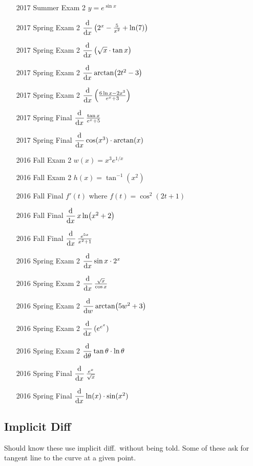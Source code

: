 \documentclass[10pt]{scrartcl}
\theoremstyle{definition}
\newcommand{\inv}{^{-1}}
\begin{document}
\begin{enumerate}
\item [2017 Summer Exam 2] $y = e^{\sin x}$
\item [2017 Spring Exam 2] $\dod{}{x}\left( 2^x - \frac{5}{x^2} + \ln(7) \right)$
\item [2017 Spring Exam 2] $\dod{}{x}\left(\sqrt x \cdot \tan x\right)$
\item [2017 Spring Exam 2] $\dod{}{x} \arctan(2t^2 - 3)$
\item [2017 Spring Exam 2] $\dod{}{x} \left( \frac{6\ln x-2x^3}{e^x+3} \right)$
\item [2017 Spring Final] $\dod{}{x} \frac{\tan x}{e^x + 5}$
\item [2017 Spring Final] $\dod{}{x} \cosine(x^3) \cdot \arctan(x)$
\item [2016 Fall Exam 2] $w(x) = x^3 e^{1/x}$
\item [2016 Fall Exam 2] $h(x) = \tan\inv(x^2)$
\item [2016 Fall Final] $f'(t)$ where $f(t) = \cos^2(2t+1)$
\item [2016 Fall Final] $\dod{}{x} x \ln(x^2 + 2)$
\item [2016 Fall Final] $\dod{}{x} \frac{e^{5x}}{x^2 + 1}$
\item [2016 Spring Exam 2] $\dod{}{x} \sin x \cdot 2^x$
\item [2016 Spring Exam 2] $\dod{}{x} \frac{\sqrt{x}}{\cos x}$
\item [2016 Spring Exam 2] $\dod{}{w} \arctan(5w^2 + 3)$
\item [2016 Spring Exam 2] $\dod{}{x}(e^{e^x})$
\item [2016 Spring Exam 2] $\dod{}{\theta} \tan\theta \cdot \ln\theta$
\item [2016 Spring Final] $\dod{}{x} \frac{e^x}{\sqrt x}$
\item [2016 Spring Final] $\dod{}{x} \ln(x) \cdot \sine(x^2)$
\end{enumerate}

\subsection{Implicit Diff}
Should know these use implicit diff.\ without being told.
Some of these ask for tangent line to the curve at a given point.
\end{document}
